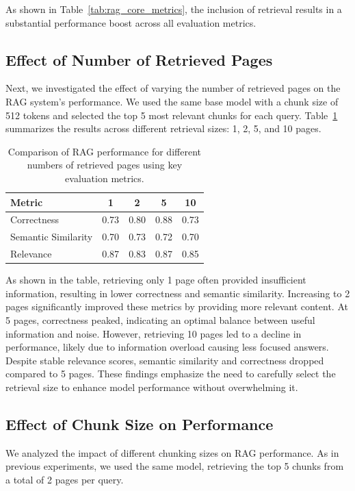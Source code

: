 \documentclass[fleqn,moreauthors,10pt]{ds_report}
\begin{document}
As shown in Table~\ref{tab:rag_core_metrics}, the inclusion of retrieval results in a substantial performance boost across all evaluation metrics.

\subsection*{Effect of Number of Retrieved Pages}
Next, we investigated the effect of varying the number of retrieved pages on the RAG system's performance. We used the same base model with a chunk size of 512 tokens and selected the top 5 most relevant chunks for each query. Table~\ref{tab:rag_pages_key_metrics} summarizes the results across different retrieval sizes: 1, 2, 5, and 10 pages. 

\begin{table}[ht]
\caption{Comparison of RAG performance for different numbers of retrieved pages using key evaluation metrics.}
\centering
\begin{tabular}{lcccc}
\toprule
\textbf{Metric} & \textbf{1} & \textbf{2} & \textbf{5} & \textbf{10} \\
\midrule
Correctness & 0.73 & 0.80 & 0.88 & 0.73 \\
Semantic Similarity & 0.70 & 0.73 & 0.72 & 0.70 \\
Relevance & 0.87 & 0.83 & 0.87 & 0.85 \\
\bottomrule
\end{tabular}
\label{tab:rag_pages_key_metrics}
\end{table}

As shown in the table, retrieving only 1 page often provided insufficient information, resulting in lower correctness and semantic similarity. Increasing to 2 pages significantly improved these metrics by providing more relevant content. At 5 pages, correctness peaked, indicating an optimal balance between useful information and noise. However, retrieving 10 pages led to a decline in performance, likely due to information overload causing less focused answers. Despite stable relevance scores, semantic similarity and correctness dropped compared to 5 pages. These findings emphasize the need to carefully select the retrieval size to enhance model performance without overwhelming it.

\subsection*{Effect of Chunk Size on Performance}
We analyzed the impact of different chunking sizes on RAG performance.  As in previous experiments, we used the same model, retrieving the top 5 chunks from a total of 2 pages per query.
\end{document}
